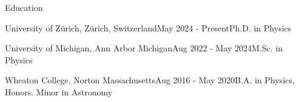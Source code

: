 \documentclass{resume} %
\begin{document}
\begin{rSection}{Education}
    \begin{rSubsection}
        {University of Zürich, Zürich, Switzerland}{May 2024 - Present}{Ph.D. in Physics}{}
        
    \end{rSubsection}
    
    \begin{rSubsection}
        {University of Michigan, Ann Arbor Michigan}{Aug 2022 - May 2024}{M.Sc. in Physics}{}
        
    \end{rSubsection}

\begin{rSubsection}
    {Wheaton College, Norton Massachusetts}{Aug 2016 - May 2020}{B.A. in Physics, Honors. Minor in Astronomy}{}
\end{rSubsection}


\end{rSection}
\end{document}
